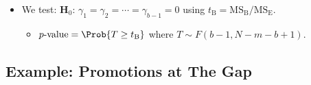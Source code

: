 \begin{itemize}
\begin{itemize}
\begin{itemize}
                        \end{itemize}
                  \item We test: $ \mathbf{H}_0 $: $ \gamma_1=\gamma_2=\cdots=\gamma_{b-1}=0 $ using $ t_\text{B}=\text{MS}_\text{B}/\text{MS}_\text{E} $.
                        \begin{itemize}
                              \item $ p\text{-value}=\Prob{T\ge t_\text{B}} $ where $ T \sim F(b-1,N-m-b+1) $.
                        \end{itemize}
            \end{itemize}
\end{itemize}
\subsection{Example: Promotions at The Gap}
